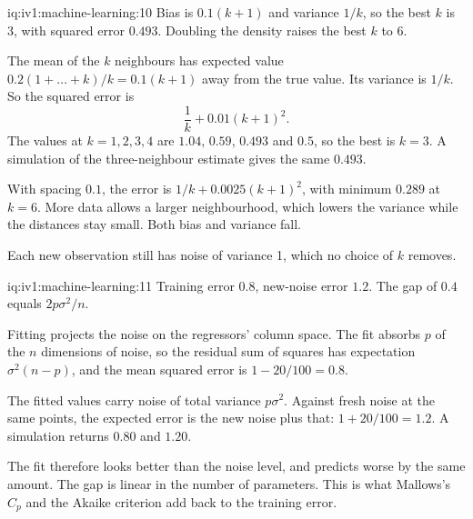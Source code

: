 \begin{solution}{iq:iv1:machine-learning:10}
Bias is $0.1(k + 1)$ and variance $1/k$, so the best $k$ is 3, with squared error $0.493$. Doubling the density raises the best $k$ to 6.

The mean of the $k$ neighbours has expected value $0.2(1 + \dots + k)/k = 0.1(k + 1)$ away from the true value. Its variance is $1/k$. So the squared error is
\[
\frac{1}{k} + 0.01(k + 1)^2.
\]
The values at $k = 1, 2, 3, 4$ are $1.04$, $0.59$, $0.493$ and $0.5$, so the best is $k = 3$. A simulation of the three-neighbour estimate gives the same $0.493$.

With spacing $0.1$, the error is $1/k + 0.0025(k + 1)^2$, with minimum $0.289$ at $k = 6$. More data allows a larger neighbourhood, which lowers the variance while the distances stay small. Both bias and variance fall.

Each new observation still has noise of variance 1, which no choice of $k$ removes.



\end{solution}

\begin{solution}{iq:iv1:machine-learning:11}
Training error $0.8$, new-noise error $1.2$. The gap of $0.4$ equals $2p\sigma^2/n$.

Fitting projects the noise on the regressors' column space. The fit absorbs $p$ of the $n$ dimensions of noise, so the residual sum of squares has expectation $\sigma^2(n - p)$, and the mean squared error is $1 - 20/100 = 0.8$.

The fitted values carry noise of total variance $p\sigma^2$. Against fresh noise at the same points, the expected error is the new noise plus that: $1 + 20/100 = 1.2$. A simulation returns $0.80$ and $1.20$.

The fit therefore looks better than the noise level, and predicts worse by the same amount. The gap is linear in the number of parameters. This is what Mallows's $C_p$ and the Akaike criterion add back to the training error.



\end{solution}

